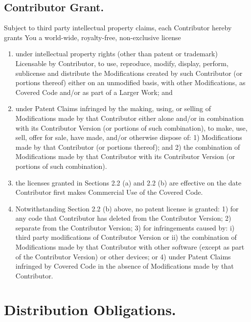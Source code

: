 \documentclass{book}
\begin{document}
\subsection{Contributor Grant.}
Subject to third party intellectual property claims, each Contributor hereby grants You a world-wide, royalty-free, non-exclusive license 
\begin{enumerate}
\item under intellectual property rights (other than patent or trademark) Licensable by Contributor, to use, reproduce, modify, display, perform, sublicense and distribute the Modifications created by such Contributor (or portions thereof) either on an unmodified basis, with other Modifications, as Covered Code and/or as part of a Larger Work; and 

\item under Patent Claims infringed by the making, using, or selling
  of Modifications made by that Contributor either alone and/or in
  combination with its Contributor Version (or portions of such
  combination), to make, use, sell, offer for sale, have made, and/or
  otherwise dispose of: 1) Modifications made by that Contributor (or
  portions thereof); and 2) the combination of Modifications made by
  that Contributor with its Contributor Version (or portions of such
  combination). 

\item the licenses granted in Sections 2.2 (a) and 2.2 (b) are effective on the date Contributor first makes Commercial Use of the Covered Code. 

\item Notwithstanding Section 2.2 (b) above, no patent license is granted: 1) for any code that Contributor has deleted from the Contributor Version; 2) separate from the Contributor Version; 3) for infringements caused by: i) third party modifications of Contributor Version or ii) the combination of Modifications made by that Contributor with other software (except as part of the Contributor Version) or other devices; or 4) under Patent Claims infringed by Covered Code in the absence of Modifications made by that Contributor. 
\end{enumerate}

\section{Distribution Obligations.}
\end{document}
